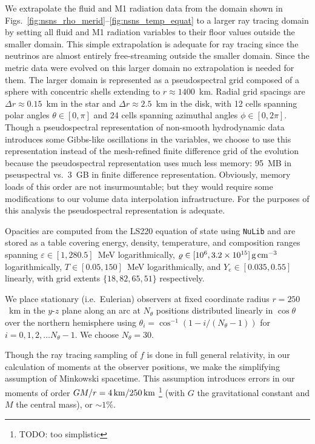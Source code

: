 \documentclass[aps,floatfix,prd,superscriptaddress,twocolumn]{revtex4-1}
\begin{document}
We extrapolate the fluid and M1 radiation data from
the domain shown in Figs.~\ref{fig:nsns_rho_merid}--\ref{fig:nsns_temp_equat}
to a larger ray tracing domain by setting all fluid and M1 radiation variables
to their floor values outside the smaller domain.
This simple extrapolation is adequate for ray tracing since
the neutrinos are almost entirely free-streaming outside the smaller domain.
Since the metric data were evolved on this larger domain no extrapolation is
needed for them.
The larger domain is represented as a pseudospectral grid
composed of a sphere with concentric shells extending to $r\approx1400$~km.
Radial grid spacings are $\Delta r \approx 0.15$~km in the star
and $\Delta r \approx 2.5$~km in the disk,
with 12 cells spanning polar angles $\theta\in[0,\pi]$
and 24 cells spanning azimuthal angles $\phi\in[0,2\pi]$.
Though a pseudospectral representation of non-smooth hydrodynamic data
introduces some Gibbs-like oscillations in the variables,
we choose to use this representation instead of the mesh-refined
finite difference grid of the evolution because the pseudospectral
representation uses much less memory:
95~MB in pseuspectral vs.\ 3~GB in finite difference representation.
Obviously, memory loads of this order are not insurmountable;
but they would require some modifications to our
volume data interpolation infrastructure.
For the purposes of this analysis the pseudospectral representation is adequate.

Opacities are computed from the LS220 equation of state using
\lstinline{NuLib} and are stored as a table covering
energy, density, temperature, and composition ranges
spanning $\varepsilon\in[1,280.5]$~MeV logarithmically,
$\varrho\in[10^6,3.2\times10^{15}]\,{\rm g}\,{\rm cm}^{-3}$ logarithmically,
$T\in[0.05,150]$~MeV logarithmically, and 
$Y_e\in[0.035,0.55]$ linearly,
with grid extents $\{18,82,65,51\}$ respectively.

We place stationary (i.e.\ Eulerian) observers at fixed coordinate radius
$r=250$~km in the $y$-$z$ plane along an arc at $N_\theta$ positions
distributed linearly in $\cos\theta$ over the northern hemisphere
using $\theta_i=\cos^{-1}\left(1-i/(N_\theta-1)\right)$
for $i=0,1,2,\ldots N_\theta-1$.
We choose $N_\theta=30$.

Though the ray tracing sampling of $f$ is done in full general relativity,
in our calculation of moments at the observer positions,
we make the simplifying assumption of Minkowski spacetime.
This assumption introduces errors in our moments of order
$GM/r=4\,{\rm km}/250\,{\rm km}$
\footnote{TODO: too simplistic}
(with $G$ the gravitational constant and $M$ the central mass),
or $\sim 1\%$.
\end{document}
